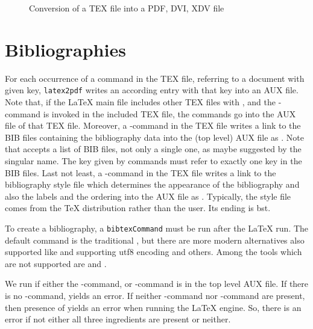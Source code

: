 \begin{figure}[htb]
\centering
{}
\caption{\label{fig:tex2pdf}Conversion of a TEX file into a PDF, DVI, XDV file }
\end{figure}

\section{Bibliographies}\label{sec:bibtex}

For each occurrence 
of a command  in the TEX file, 
referring to a document with given key,
\texttt{latex2pdf} writes an according entry  with that key 
into an AUX file. 
Note that, 
if the \LaTeX{} main file includes other TEX files with , 
and the -command is invoked in the included TEX file, 
the  commands go into the AUX file of that TEX file. 
Moreover, a -command in the TEX file 
writes a link to the BIB files containing the bibliography data 
into the (top level) AUX file as . 
Note that  accepts a list of BIB files, not only a single one, 
as maybe suggested by the singular name. 
The key given by  commands must refer to exactly one key in the BIB files. 
Last not least, a -command in the TEX file 
writes a link to the bibliography style file 
which determines the appearance of the bibliography 
and also the labels and the ordering 
into the AUX file as . 
Typically, the style file comes from the \TeX{} distribution rather than the user. 
Its ending is \gls{bst}. 

To create a bibliography, 
a \texttt{bibtexCommand} must be run after the \LaTeX{} run. 
The default command is the traditional , 
but there are more modern alternatives also supported
like  and  supporting utf8 encoding 
and others. 
Among the tools which are not supported are  and . 

We run  if either 
the -command, or -command 
is in the top level AUX file. 
If there is no -command,  yields an error. 
If neither -command nor -command 
are present, then presence of  yields an error when running the \LaTeX{} engine. 
So, there is an error if not either all three ingredients are present or neither. 

